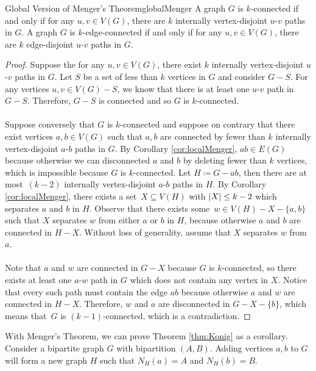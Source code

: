 \documentclass[math]{amznotes}
\theoremstyle{remark}
\begin{document}
\begin{corbox}{Global Version of Menger's Theorem}{globalMenger}
    A graph $G$ is $k$-connected if and only if for any $u, v \in V(G)$, there are $k$ internally vertex-disjoint $u$-$v$ paths in $G$. A graph $G$ is $k$-edge-connected if and only if for any $u, v \in V(G)$, there are $k$ edge-disjoint $u$-$v$ paths in $G$. 
    \tcblower
    \begin{proof}
        Suppose the for any $u, v \in V(G)$, there exist $k$ internally vertex-disjoint $u$-$v$ paths in $G$. Let $S$ be a set of less than $k$ vertices in $G$ and consider $G - S$. For any vertices $u, v \in V(G) - S$, we know that there is at least one $u$-$v$ path in $G - S$. Therefore, $G - S$ is connected and so $G$ is $k$-connected.
        \\\\
        Suppose conversely that $G$ is $k$-connected and suppose on contrary that there exist vertices $a, b \in V(G)$ such that $a, b$ are connected by fewer than $k$ internally vertex-disjoint $a$-$b$ paths in $G$. By Corollary \ref{cor:localMenger}, $ab \in E(G)$ because otherwise we can disconnected $a$ and $b$ by deleting fewer than $k$ vertices, which is impossible because $G$ is $k$-connected. Let $H \coloneqq G - ab$, then there are at most~$(k - 2)$ internally vertex-disjoint $a$-$b$ paths in $H$. By Corollary \ref{cor:localMenger}, there exists a set~$X \subseteq V(H)$ with ${\left\lvert {X} \right\rvert} \leq k - 2$ which separates $a$ and $b$ in $H$. Observe that there exists some~$w \in V(H) - X - \{a, b\}$ such that $X$ separates $w$ from either $a$ or $b$ in $H$, because otherwise $a$ and $b$ are connected in $H - X$. Without loss of generality, assume that $X$ separates $w$ from $a$. 
        \\\\
        Note that $a$ and $w$ are connected in $G - X$ because $G$ is $k$-connected, so there exists at least one $a$-$w$ path in $G$ which does not contain any vertex in $X$. Notice that every such path must contain the edge $ab$ because otherwise $a$ and $w$ are connected in $H - X$. Therefore, $w$ and $a$ are disconnected in $G - X - \{b\}$, which means that~$G$ is $(k - 1)$-connected, which is a contradiction.
    \end{proof}
\end{corbox}
With Menger's Theorem, we can prove Theorem \ref{thm:Konig} as a corollary. Consider a bipartite graph $G$ with bipartition $(A, B)$. Adding vertices $a, b$ to $G$ will form a new graph $H$ such that $N_H(a) = A$ and $N_H(b) = B$.
\end{document}
